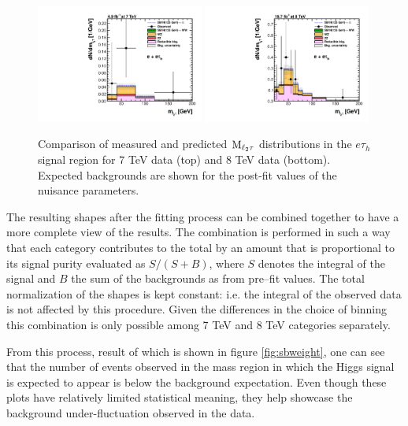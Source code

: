 \begin{figure}
\begin{center}
  \includegraphics[width=0.49\textwidth]{4_Analisys/pics/postfit/eet_postfit_7TeV_FitAllChannels.pdf}
  \includegraphics[width=0.49\textwidth]{4_Analisys/pics/postfit/eet_postfit_8TeV_FitAllChannels.pdf}\\
  \caption{Comparison of measured and predicted $\rm{M}_{\ell_2\tau}$ distributions in the $e\tau_h$ signal region for 7 TeV data (top) and 8 TeV data (bottom). 
    Expected backgrounds are shown for the post-fit values of the nuisance parameters. }
  \label{fig:LLT_eet_postfit}
\end{center}
\end{figure}

The resulting shapes after the fitting process can be combined together to have a more complete view of the results. The combination is performed in such a way that each category contributes to the total by an amount that is proportional to its signal purity evaluated as $S / (S+B)$, where $S$ denotes the integral of the signal and $B$ the sum of the backgrounds as from pre--fit values. The total normalization of the shapes is kept constant: i.e. the integral of the observed data is not affected by this procedure. Given the differences in the choice of binning this combination is only possible among 7 TeV and 8 TeV categories separately. 

From this process, result of which is shown in figure \ref{fig:sbweight}, one can see that the number of events observed in the mass region in which the Higgs signal is expected to appear is below the background expectation.%
Even though these plots have relatively limited statistical meaning, they help showcase the background under-fluctuation observed in the data.


